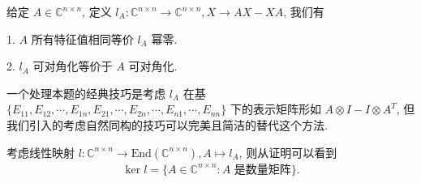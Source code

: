 \documentclass[../../main.tex]{subfiles}
\begin{document}
\begin{theorem}[Lie映射经典性质]\label{theorem:Lie映射经典性质}
给定 $A \in \mathbb{C}^{n \times n}$, 定义 $l_A: \mathbb{C}^{n \times n} \to \mathbb{C}^{n \times n}, X \to AX - XA$, 我们有

1. $A$ 所有特征值相同等价 $l_A$ 幂零.

2. $l_A$ 可对角化等价于 $A$ 可对角化.
\end{theorem}
\begin{note}
一个处理本题的经典技巧是考虑 $l_A$ 在基 $\{E_{11}, E_{12}, \cdots, E_{1n}, E_{21}, \cdots, E_{2n}, \cdots, E_{n1}, \cdots, E_{nn}\}$ 下的表示矩阵形如 $A \otimes I - I \otimes A^T$, 但我们引入的考虑自然同构的技巧可以完美且简洁的替代这个方法.
\end{note}
\begin{note}
考虑线性映射 $l: \mathbb{C}^{n \times n} \to \mathrm{End}(\mathbb{C}^{n \times n}), A \mapsto l_A$, 则从证明可以看到
\begin{align*}
\ker l = \{A \in \mathbb{C}^{n \times n} : A \text{ 是数量矩阵}\}.
\end{align*}
\end{note}
\end{document}
